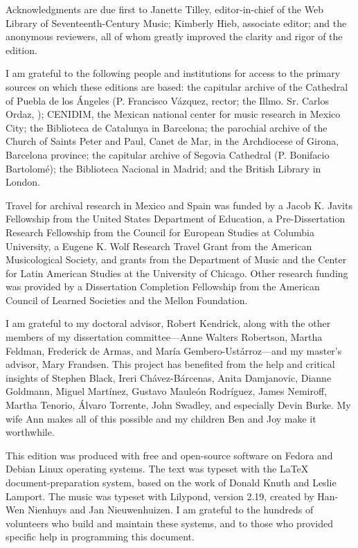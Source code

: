 Acknowledgments are due first to Janette Tilley, editor-in-chief of the Web
Library of Seventeenth-Century Music; Kimberly Hieb, associate editor; and the
anonymous reviewers, all of whom greatly improved the clarity and rigor of the
edition. 

I am grateful to the following people and institutions for access to the 
primary sources on which these editions are based: 
the capitular archive of the Cathedral of Puebla de los Ángeles (P. Francisco 
Vázquez, rector; the Illmo. Sr. Carlos Ordaz, );
CENIDIM, the Mexican national center for music research in Mexico City;
the Biblioteca de Catalunya in Barcelona;
the parochial archive of the Church of Saints Peter and Paul, Canet de Mar, in 
the Archdiocese of Girona, Barcelona province;
the capitular archive of Segovia Cathedral (P. Bonifacio Bartolomé);
the Biblioteca Nacional in Madrid; and
the British Library in London.

Travel for archival research in Mexico and Spain was funded by 
a Jacob K. Javits Fellowship from the United States Department of Education, 
a Pre-Dissertation Research Fellowship from the Council for European Studies at 
Columbia University, 
a Eugene K. Wolf Research Travel Grant from the American Musicological Society, 
and grants from the Department of Music and the Center for Latin American 
Studies at the University of Chicago.
Other research funding was provided by a Dissertation Completion Fellowship 
from the American Council of Learned Societies and the Mellon Foundation.

I am grateful to my doctoral advisor, Robert Kendrick, along with the other
members of my dissertation committee---Anne Walters Robertson, Martha Feldman,
Frederick de Armas, and María Gembero-Ustárroz---and my master's advisor, Mary
Frandsen.
This project has benefited from the help and critical insights of 
Stephen Black,
Ireri Chávez-Bárcenas,
Anita Damjanovic, 
Dianne Goldmann,
Miguel Martínez, 
Gustavo Mauleón Rodríguez,
James Nemiroff, 
Martha Tenorio,
Álvaro Torrente, 
John Swadley,
and especially Devin Burke.
My wife Ann makes all of this possible and my children Ben and Joy make it
worthwhile.


This edition was produced with free and open-source software on Fedora and
Debian Linux operating systems.
The text was typeset with the \LaTeX{} document-preparation system, based on 
the work of Donald Knuth and Leslie Lamport.
The music was typeset with Lilypond, version 2.19, created by Han-Wen Nienhuys
and Jan Nieuwenhuizen.
I am grateful to the hundreds of volunteers who build and maintain these 
systems, and to those who provided specific help in programming this document.


